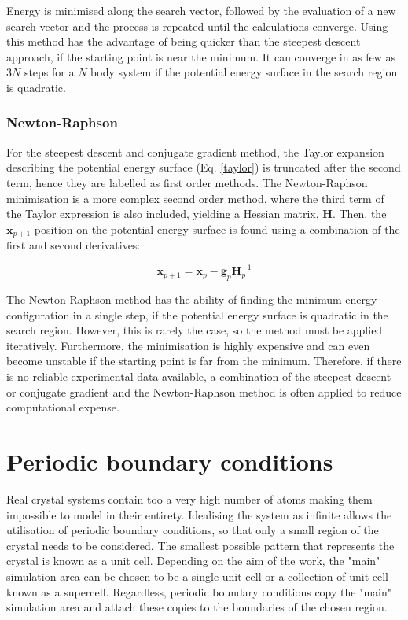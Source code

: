 \documentclass[12pt]{report}
\begin{document}
\noindent
Energy is minimised along the search vector, followed by the evaluation of a new search vector and the process is repeated until the calculations converge.
Using this method has the advantage of being quicker than the steepest descent approach, if the starting point is near the minimum.
It can converge in as few as $3N$ steps for a $N$ body system if the potential energy surface in the search region is quadratic.

\subsubsection{Newton-Raphson}

For the steepest descent and conjugate gradient method, the Taylor expansion describing the potential energy surface (Eq. \ref{taylor}) is truncated after the second term, hence they are labelled as first order methods.
The Newton-Raphson minimisation is a more complex second order method, where the third term of the Taylor expression is also included, yielding a Hessian matrix, $\textbf{H}$.
Then, the $\textbf{x}_{p+1}$ position on the potential energy surface is found using a combination of the first and second derivatives:

\begin{equation}
    \textbf{x}_{p+1} = \textbf{x}_p - \textbf{g}_p \textbf{H}_p^{-1}
\end{equation}

\noindent
The Newton-Raphson method has the ability of finding the minimum energy configuration in a single step, if the potential energy surface is quadratic in the search region.
However, this is rarely the case, so the method must be applied iteratively.
Furthermore, the minimisation is highly expensive and can even become unstable if the starting point is far from the minimum.
Therefore, if there is no reliable experimental data available, a combination of the steepest descent or conjugate gradient and the Newton-Raphson method is often applied to reduce computational expense.

\section{Periodic boundary conditions}

Real crystal systems contain too  a very high number of atoms making them impossible to model in their entirety. 
Idealising the system as infinite allows the utilisation of periodic boundary conditions, so that only a small region of the crystal needs to be considered.
The smallest possible pattern that represents the crystal is known as a unit cell.
Depending on the aim of the work, the "main" simulation area can be chosen to be a single unit cell or a collection of unit cell known as a supercell.
Regardless, periodic boundary conditions copy the "main" simulation area and attach these copies to the boundaries of the chosen region.
\end{document}
